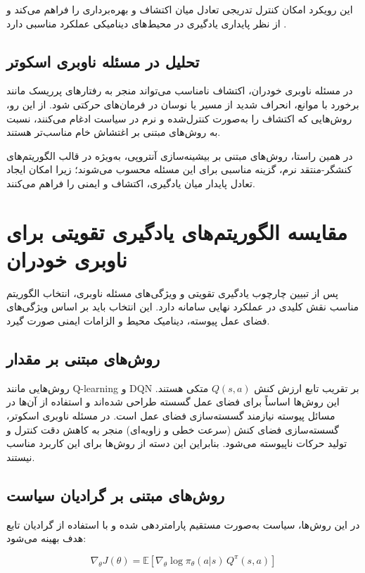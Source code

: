 این رویکرد امکان کنترل تدریجی تعادل میان اکتشاف و بهره‌برداری را فراهم می‌کند و از نظر پایداری یادگیری در محیط‌های دینامیکی عملکرد مناسبی دارد \cite{Haarnoja2018SAC}.

\subsection{تحلیل در مسئله ناوبری اسکوتر}

در مسئله ناوبری خودران، اکتشاف نامناسب می‌تواند منجر به رفتارهای پرریسک مانند برخورد با موانع، انحراف شدید از مسیر یا نوسان در فرمان‌های حرکتی شود. از این رو، روش‌هایی که اکتشاف را به‌صورت کنترل‌شده و نرم در سیاست ادغام می‌کنند، نسبت به روش‌های مبتنی بر اغتشاش خام مناسب‌تر هستند.

در همین راستا، روش‌های مبتنی بر بیشینه‌سازی آنتروپی، به‌ویژه در قالب الگوریتم‌های کنشگر-منتقد نرم، گزینه مناسبی برای این مسئله محسوب می‌شوند؛ زیرا امکان ایجاد تعادل پایدار میان یادگیری، اکتشاف و ایمنی را فراهم می‌کنند.
\section{مقایسه الگوریتم‌های یادگیری تقویتی برای ناوبری خودران}

پس از تبیین چارچوب یادگیری تقویتی و ویژگی‌های مسئله ناوبری، انتخاب الگوریتم مناسب نقش کلیدی در عملکرد نهایی سامانه دارد. این انتخاب باید بر اساس ویژگی‌های فضای عمل پیوسته، دینامیک محیط و الزامات ایمنی صورت گیرد.

\subsection{روش‌های مبتنی بر مقدار}

روش‌هایی مانند Q-learning و DQN بر تقریب تابع ارزش کنش $Q(s,a)$ متکی هستند. این روش‌ها اساساً برای فضای عمل گسسته طراحی شده‌اند و استفاده از آن‌ها در مسائل پیوسته نیازمند گسسته‌سازی فضای عمل است. در مسئله ناوبری اسکوتر، گسسته‌سازی فضای کنش (سرعت خطی و زاویه‌ای) منجر به کاهش دقت کنترل و تولید حرکات ناپیوسته می‌شود. بنابراین این دسته از روش‌ها برای این کاربرد مناسب نیستند.

\subsection{روش‌های مبتنی بر گرادیان سیاست}

در این روش‌ها، سیاست به‌صورت مستقیم پارامتردهی شده و با استفاده از گرادیان تابع هدف بهینه می‌شود:

\begin{equation}
	\nabla_\theta J(\theta) =
	\mathbb{E}
	\left[
	\nabla_\theta \log \pi_\theta(a|s)\, Q^\pi(s,a)
	\right]
\end{equation}

